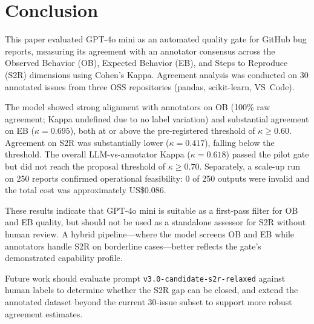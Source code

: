

\section{Conclusion}\label{sec:conclusion}

This paper evaluated GPT-4o mini as an automated quality gate for
GitHub bug reports, measuring its agreement with an annotator
consensus across the Observed Behavior (OB), Expected Behavior (EB),
and Steps to Reproduce (S2R) dimensions using Cohen's Kappa.
Agreement analysis was conducted on 30 annotated issues from three
OSS repositories (pandas, scikit-learn, VS~Code).

The model showed strong alignment with annotators on OB (100\% raw
agreement; Kappa undefined due to no label variation) and substantial
agreement on EB ($\kappa = 0.695$), both at or above the pre-registered
threshold of $\kappa \geq 0.60$.  Agreement on S2R was substantially
lower ($\kappa = 0.417$), falling below the threshold.  The overall
LLM-vs-annotator Kappa ($\kappa = 0.618$) passed the pilot gate but
did not reach the proposal threshold of $\kappa \geq 0.70$.
Separately, a scale-up run on 250 reports confirmed operational
feasibility: 0 of 250 outputs were invalid and the total cost was
approximately US\$0.086.

These results indicate that GPT-4o mini is suitable as a first-pass
filter for OB and EB quality, but should not be used as a standalone
assessor for S2R without human review.  A hybrid pipeline---where the
model screens OB and EB while annotators handle S2R on borderline
cases---better reflects the gate's demonstrated capability profile.

Future work should evaluate prompt \texttt{v3.0-candidate-s2r-relaxed}
against human labels to determine whether the S2R gap can be closed,
and extend the annotated dataset beyond the current 30-issue subset to
support more robust agreement estimates.
